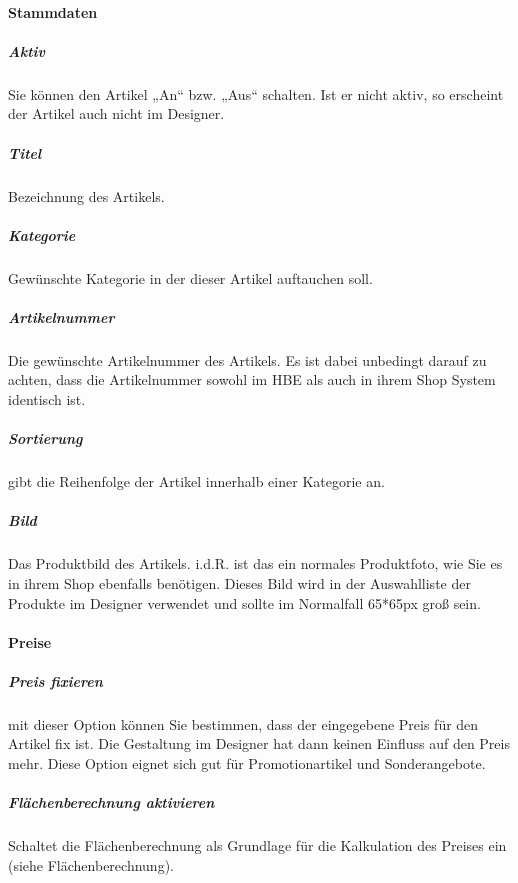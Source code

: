 \documentclass[letterpaper,10pt,ngerman]{sphinxmanual}
\begin{document}
\paragraph{Stammdaten}
\label{\detokenize{hbe/products/fields/base:stammdaten}}\label{\detokenize{hbe/products/fields/base::doc}}

\subparagraph{Aktiv}
\label{\detokenize{hbe/products/fields/base:aktiv}}
Sie können den Artikel „An“ bzw. „Aus“ schalten. Ist er
nicht aktiv, so erscheint der Artikel auch nicht im Designer.


\subparagraph{Titel}
\label{\detokenize{hbe/products/fields/base:titel}}
Bezeichnung des Artikels.


\subparagraph{Kategorie}
\label{\detokenize{hbe/products/fields/base:kategorie}}
Gewünschte Kategorie in der dieser Artikel auftauchen soll.


\subparagraph{Artikelnummer}
\label{\detokenize{hbe/products/fields/base:artikelnummer}}
Die gewünschte Artikelnummer des Artikels.
Es ist dabei unbedingt darauf zu achten, dass die
Artikelnummer sowohl im HBE als auch in ihrem
Shop System identisch ist.


\subparagraph{Sortierung}
\label{\detokenize{hbe/products/fields/base:sortierung}}
gibt die Reihenfolge der Artikel innerhalb einer
Kategorie an.


\subparagraph{Bild}
\label{\detokenize{hbe/products/fields/base:bild}}
Das Produktbild des Artikels. i.d.R. ist das ein normales
Produktfoto, wie Sie es in ihrem Shop ebenfalls benötigen.
Dieses Bild wird in der Auswahlliste der Produkte im
Designer verwendet und sollte im Normalfall 65*65px groß
sein.


\paragraph{Preise}
\label{\detokenize{hbe/products/fields/prices:preise}}\label{\detokenize{hbe/products/fields/prices::doc}}

\subparagraph{Preis fixieren}
\label{\detokenize{hbe/products/fields/prices:preis-fixieren}}
mit dieser Option können Sie bestimmen, dass
der eingegebene Preis für den Artikel fix ist. Die Gestaltung
im Designer hat dann keinen Einfluss auf den Preis mehr.
Diese Option eignet sich gut für Promotionartikel und
Sonderangebote.


\subparagraph{Flächenberechnung aktivieren}
\label{\detokenize{hbe/products/fields/prices:flachenberechnung-aktivieren}}
Schaltet die Flächenberechnung als Grundlage für die Kalkulation des
Preises ein (siehe Flächenberechnung).
\end{document}
